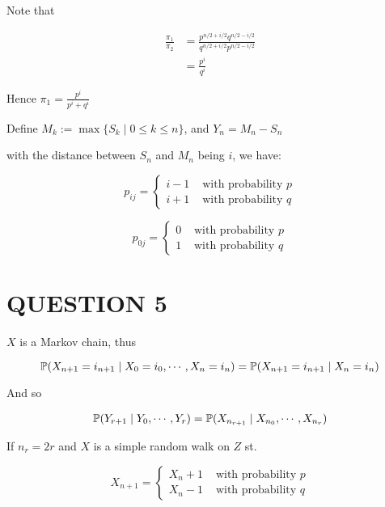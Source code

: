 \documentclass[a4paper]{article}
\begin{document}
Note that

\begin{align*}
\frac{\pi_{1}}{\pi_{2}} & = \frac{  p^{n/2 + i/2} q^{n/2 - i/2}  }{  q^{n/2 + i/2} p^{n/2 - i/2} } \\
& = \frac{p^{i}}{q^{i}}
\end{align*}

Hence $ \pi_{1} = \frac{p^{i}}{p^{i} + q^{i}} $



Define $ M_{k} := \max \{ S_{k} \; | \; 0 \leq k \leq n \} $, and $ Y_{n} = M_{n} - S_{n} $


\begin{center}
\end{center}

with the distance between $ S_{n} $ and $ M_{n} $ being $ i $, we have:

\[  p_{ij} = \begin{cases}   i-1 & \text{ with probability } p \\ i + 1 & \text{ with probability } q \end{cases} \]

\[  p_{0j} = \begin{cases}   0 & \text{ with probability } p \\  1 & \text{ with probability } q \end{cases} \]

\section{QUESTION 5}

$ X $ is a Markov chain, thus

\[ \P( X_{n+1} = i_{n+1} \; | \; X_{0} = i_{0}, \cdots, X_{n} = i_{n} ) = \P(X_{n+1} = i_{n+1} \; | \; X_{n} = i_{n} ) \]

And so

\begin{align*}
\P(Y_{r+1}  \; | \; Y_{0},\cdots,Y_{r} ) & = \P(X_{n_{r+1}} \; | \; X_{n_{0}},\cdots,X_{n_{r}}  ) \\
\end{align*}

If $ n_{r} = 2r $ and $ X $ is a simple random walk on $ Z $ st. 

\[ X_{n+1} = \begin{cases} X_{n} + 1 & \text{ with probability } p \\ X_{n} - 1 & \text{ with probability } q \end{cases} \] 
\end{document}
